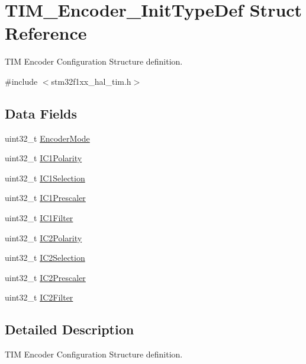 \hypertarget{struct_t_i_m___encoder___init_type_def}{}\section{T\+I\+M\+\_\+\+Encoder\+\_\+\+Init\+Type\+Def Struct Reference}
\label{struct_t_i_m___encoder___init_type_def}


T\+IM Encoder Configuration Structure definition.  




{\ttfamily \#include $<$stm32f1xx\+\_\+hal\+\_\+tim.\+h$>$}

\subsection*{Data Fields}
\begin{DoxyCompactItemize}
\item 
uint32\+\_\+t \hyperlink{struct_t_i_m___encoder___init_type_def_ab451cb61e197d30ca8d3ce1c820ae1a4}{Encoder\+Mode}
\item 
uint32\+\_\+t \hyperlink{struct_t_i_m___encoder___init_type_def_ac1191c7421a3ca4c53ec7875870812e5}{I\+C1\+Polarity}
\item 
uint32\+\_\+t \hyperlink{struct_t_i_m___encoder___init_type_def_ae0c7ebe03057c1dd939555d1d924afd1}{I\+C1\+Selection}
\item 
uint32\+\_\+t \hyperlink{struct_t_i_m___encoder___init_type_def_aa913a8df0a4c97fefa87ff760fae10cb}{I\+C1\+Prescaler}
\item 
uint32\+\_\+t \hyperlink{struct_t_i_m___encoder___init_type_def_a5efa2ad5085fe72fb0b5dc2e2fc61def}{I\+C1\+Filter}
\item 
uint32\+\_\+t \hyperlink{struct_t_i_m___encoder___init_type_def_a67a8a854c58aedd9d37aa9f2ad4f49b4}{I\+C2\+Polarity}
\item 
uint32\+\_\+t \hyperlink{struct_t_i_m___encoder___init_type_def_af5b15660e7593a0fa62ee00059b3a9f4}{I\+C2\+Selection}
\item 
uint32\+\_\+t \hyperlink{struct_t_i_m___encoder___init_type_def_a0ce08ea64b9e8986336acf65fbfc1976}{I\+C2\+Prescaler}
\item 
uint32\+\_\+t \hyperlink{struct_t_i_m___encoder___init_type_def_ab64eaec6065c8729c961721901f6a8d7}{I\+C2\+Filter}
\end{DoxyCompactItemize}


\subsection{Detailed Description}
T\+IM Encoder Configuration Structure definition. 


